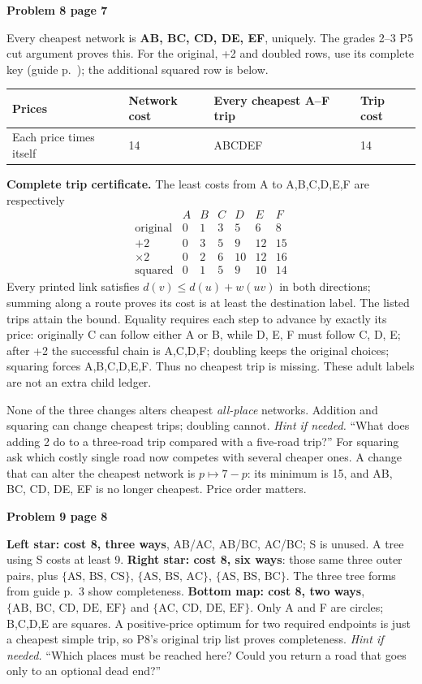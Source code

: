 \documentclass[11pt]{article}
\newcommand{\sub}[1]{\par\textbf{#1}\par\nobreak}
\newcommand{\hint}[1]{\textit{Hint if needed.} #1}
\newcommand{\links}[1]{\ensuremath{\{\text{#1}\}}}
\begin{document}
\sub{Problem 8 page 7}
Every cheapest network is \textbf{AB, BC, CD, DE, EF}, uniquely. The grades 2--3 P5 cut argument proves this. For the original, +2 and doubled rows, use its complete key (guide p.~\pageref{grid-key}); the additional squared row is below.
\begin{center}\small
\begin{tabular}{llll}
Prices & Network cost & Every cheapest A--F trip & Trip cost\\\midrule
Each price times itself & 14 & ABCDEF & 14
\end{tabular}
\end{center}
\textbf{Complete trip certificate.}\label{trip-certificate} The least costs from A to A,B,C,D,E,F are respectively
\[
\begin{array}{c|rrrrrr}
 &A&B&C&D&E&F\\\hline
\text{original}&0&1&3&5&6&8\\
+2&0&3&5&9&12&15\\
\times2&0&2&6&10&12&16\\
\text{squared}&0&1&5&9&10&14
\end{array}
\]
Every printed link satisfies $d(v)\le d(u)+w(uv)$ in both directions; summing along a route proves its cost is at least the destination label. The listed trips attain the bound. Equality requires each step to advance by exactly its price: originally C can follow either A or B, while D, E, F must follow C, D, E; after +2 the successful chain is A,C,D,F; doubling keeps the original choices; squaring forces A,B,C,D,E,F. Thus no cheapest trip is missing. These adult labels are not an extra child ledger.

None of the three changes alters cheapest \emph{all-place} networks. Addition and squaring can change cheapest trips; doubling cannot. \hint{``What does adding 2 do to a three-road trip compared with a five-road trip?''} For squaring ask which costly single road now competes with several cheaper ones. A change that can alter the cheapest network is $p\mapsto7-p$: its minimum is 15, and AB, BC, CD, DE, EF is no longer cheapest. Price order matters.

\sub{Problem 9 page 8}
\textbf{Left star: cost 8, three ways}, AB/AC, AB/BC, AC/BC; S is unused. A tree using S costs at least 9. \textbf{Right star: cost 8, six ways}: those same three outer pairs, plus \links{AS, BS, CS}, \links{AS, BS, AC}, \links{AS, BS, BC}. The three tree forms from guide p.~3 show completeness. \textbf{Bottom map: cost 8, two ways}, \links{AB, BC, CD, DE, EF} and \links{AC, CD, DE, EF}. Only A and F are circles; B,C,D,E are squares. A positive-price optimum for two required endpoints is just a cheapest simple trip, so P8's original trip list proves completeness. \hint{``Which places must be reached here? Could you return a road that goes only to an optional dead end?''}
\end{document}
